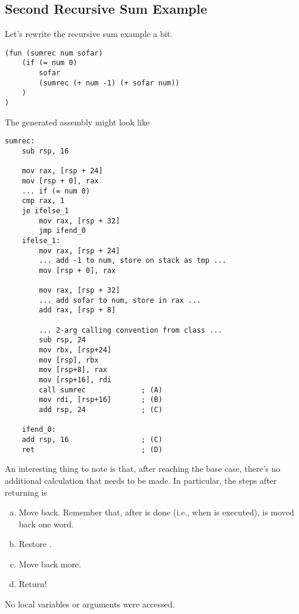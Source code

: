 \subsection{Second Recursive Sum Example}
Let's rewrite the recursive sum example a bit.  
\begin{verbatim}
(fun (sumrec num sofar)
    (if (= num 0)
        sofar 
        (sumrec (+ num -1) (+ sofar num))
    )
)\end{verbatim}
The generated assembly might look like 
\begin{verbatim}
sumrec:
    sub rsp, 16
    
    mov rax, [rsp + 24]
    mov [rsp + 0], rax
    ... if (= num 0)  
    cmp rax, 1
    je ifelse_1
        mov rax, [rsp + 32]
        jmp ifend_0
    ifelse_1:
        mov rax, [rsp + 24]
        ... add -1 to num, store on stack as tmp ...
        mov [rsp + 0], rax

        mov rax, [rsp + 32]
        ... add sofar to num, store in rax ...
        add rax, [rsp + 8]
  
        ... 2-arg calling convention from class ...
        sub rsp, 24
        mov rbx, [rsp+24]
        mov [rsp], rbx
        mov [rsp+8], rax
        mov [rsp+16], rdi
        call sumrec             ; (A)
        mov rdi, [rsp+16]       ; (B)
        add rsp, 24             ; (C)
    
    ifend_0:
    add rsp, 16                 ; (C)
    ret                         ; (D)\end{verbatim}
An interesting thing to note is that, after reaching the base case, there's no additional calculation that needs to be made. In particular, the steps after returning is 
\begin{enumerate}[(a)]
    \item Move  back. Remember that, after  is done (i.e., when  is executed),  is moved back one word.
    \item Restore .
    \item Move  back more. 
    \item Return!
\end{enumerate}
No local variables or arguments were accessed.